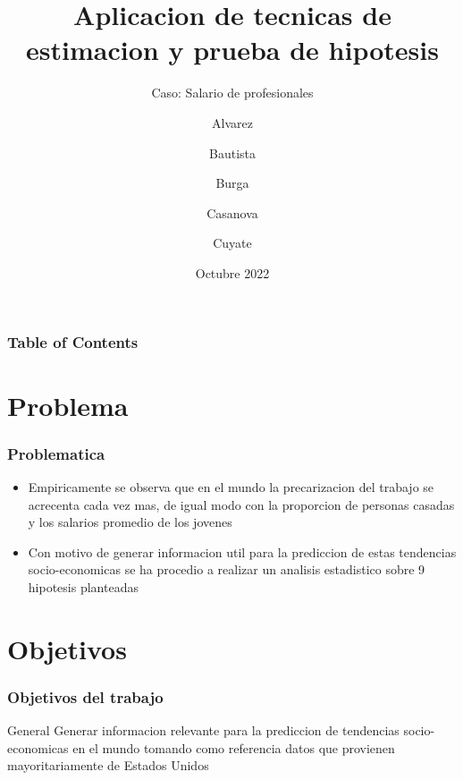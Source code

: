 \documentclass{beamer}
\title[PC1 Estadistica Aplicada] %
{Aplicacion de tecnicas de estimacion y prueba de hipotesis}
\subtitle{Caso: Salario de profesionales}
\author %
{
  Alvarez \and Bautista \and Burga \and
  Casanova \and  Cuyate
}
\institute
{
  \inst{1}%
  Facultad de Ingenieria Industrial y de Sistemas\\
  Universidad Nacional de Ingenieria
}
\date
{ Octubre 2022}
\begin{document}
\frame{\titlepage}


\begin{frame}
\frametitle{Table of Contents}
\tableofcontents
\end{frame}

\section{Problema}

\begin{frame}
\frametitle{Problematica}

\begin{itemize}
    \item Empiricamente se observa que en el mundo la precarizacion del trabajo
se acrecenta cada vez mas, de igual modo con la proporcion de personas
casadas y los salarios promedio de los jovenes

    \item Con motivo de generar informacion util para la prediccion de estas tendencias
socio-economicas se ha procedio a realizar un analisis estadistico sobre
9 hipotesis planteadas

\end{itemize}
\end{frame}



\section{Objetivos}

\begin{frame}

\frametitle{Objetivos del trabajo}

\begin{alertblock}{General}
  Generar informacion relevante para la prediccion de tendencias
  socio-economicas en el mundo tomando como referencia datos
  que provienen mayoritariamente de Estados Unidos
\end{alertblock}
\end{frame}
\end{document}
